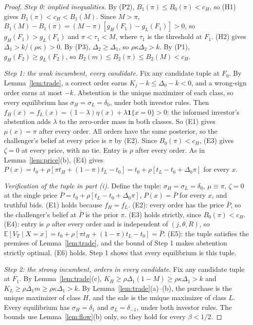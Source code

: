\documentclass[11pt]{article}
\theoremstyle{definition}
\newcommand{\E}{\mathbb E}
\newcommand{\one}{\mathbf 1}
\begin{document}
\begin{proof}
\emph{Step 0: implied inequalities.} By (P2), $B_1(\pi)\le B_0(\pi)<c_H$, so (H1) gives
$B_1(\pi)<c_H<B_1(M)$. Since $M>\pi$, $B_1(M)-B_1(\pi)=(M-\pi)[g_H(F_1)-g_L(F_1)]>0$, so $g_H(F_1)>g_L(F_1)$ and
$\pi<\tau_1<M$, where $\tau_1$ is the threshold at $F_1$. (H2) gives $\Delta_1>k/(\rho\kappa)>0$. By (P3),
$\Delta_2\ge\Delta_1$, so $\rho\kappa\Delta_2>k$. By (P1), $g_H(F_2)\ge g_L(F_2)$, so
$B_2(m)\le B_2(\pi)\le B_2(M)<c_H$.

\emph{Step 1: the weak incumbent, every candidate.} Fix any candidate tuple at $F_0$. By Lemma~\ref{lem:trade},
a correct order earns $K_j-k\le\Delta_0-k<0$, and a wrong-sign order earns at most $-k$. Abstention is the unique
maximizer of each class, so every equilibrium has $\sigma_H=\sigma_L=\delta_0$, under both investor rules.
Then $f_H(x)=f_L(x)=(1-\lambda)\eta(x)+\lambda\one\{x=0\}>0$: the informed investor's abstention adds $\lambda$ to
the zero-order mass in both classes. So (E1) gives $\mu(x)=\pi$ after every order. All orders have the
same posterior, so the challenger's belief at every price is $\pi$ by (E2). Since $B_0(\pi)<c_H$, (E3) gives
$\zeta=0$ at every price, with no tie. Entry is $\rho$ after every order. As in Lemma~\ref{lem:price}(b), (E4)
gives $P(x)=t_0+\rho[\pi t_H+(1-\pi)t_L-t_0]=t_0+\rho[t_L-t_0+\Delta_0\pi]$ for every $x$.

\emph{Verification of the tuple in part (i).} Define the tuple: $\sigma_H=\sigma_L=\delta_0$, $\mu\equiv\pi$,
$\zeta=0$ at the single price $\bar P=t_0+\rho[t_L-t_0+\Delta_0\pi]$, $P(x)=\bar P$ for every $x$, and truthful bids.
(E1) holds because $f_H=f_L$. (E2): every order has the price $\bar P$, so the challenger's belief at $\bar P$ is
the prior $\pi$. (E3) holds strictly, since $B_0(\pi)<c_H$. (E4): entry is $\rho$ after every order and is
independent of $(j,\theta,R)$, so $\E[V_T\mid X=x]=t_0+\rho[\pi t_H+(1-\pi)t_L-t_0]=\bar P$. (E5): the tuple
satisfies the premises of Lemma~\ref{lem:trade}, and the bound of Step 1 makes abstention strictly optimal.
(E6) holds. Step 1 shows that every equilibrium is this tuple.

\emph{Step 2: the strong incumbent, orders in every candidate.} Fix any candidate tuple at $F_1$. By
Lemma~\ref{lem:trade}(c), $K_H\ge\rho\Delta_1(1-M)\ge\rho\kappa\Delta_1>k$ and $K_L\ge\rho\Delta_1m\ge\rho\kappa\Delta_1>k$.
By Lemma~\ref{lem:trade}(a)--(b), the purchase is the unique maximizer of class $H$, and the sale is the unique
maximizer of class $L$. Every equilibrium has $\sigma_H=\delta_1$ and $\sigma_L=\delta_{-1}$, under both
investor rules. The bounds use Lemma~\ref{lem:flow}(b) only, so they hold for every $\beta<1/2$.


\end{proof}
\end{document}
